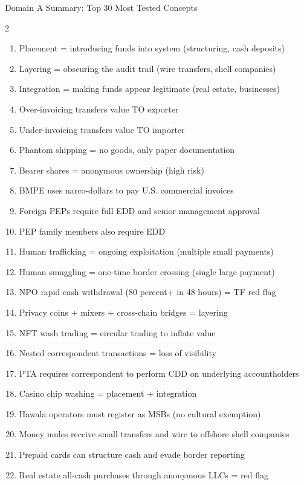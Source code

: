 \documentclass[11pt,a4paper]{beamer}
\begin{document}
	\begin{frame}{Domain A Summary: Top 30 Most Tested Concepts}
		\begin{multicols}{2}
			\begin{enumerate}
				\item Placement = introducing funds into system (structuring, cash deposits)
				\item Layering = obscuring the audit trail (wire transfers, shell companies)
				\item Integration = making funds appear legitimate (real estate, businesses)
				\item Over-invoicing transfers value TO exporter
				\item Under-invoicing transfers value TO importer
				\item Phantom shipping = no goods, only paper documentation
				\item Bearer shares = anonymous ownership (high risk)
				\item BMPE uses narco-dollars to pay U.S. commercial invoices
				\item Foreign PEPs require full EDD and senior management approval
				\item PEP family members also require EDD
				\item Human trafficking = ongoing exploitation (multiple small payments)
				\item Human smuggling = one-time border crossing (single large payment)
				\item NPO rapid cash withdrawal (80 percent+ in 48 hours) = TF red flag
				\item Privacy coins + mixers + cross-chain bridges = layering
				\item NFT wash trading = circular trading to inflate value
				\item Nested correspondent transactions = loss of visibility
				\item PTA requires correspondent to perform CDD on underlying accountholders
				\item Casino chip washing = placement + integration
				\item Hawala operators must register as MSBs (no cultural exemption)
				\item Money mules receive small transfers and wire to offshore shell companies
				\item Prepaid cards can structure cash and evade border reporting
				\item Real estate all-cash purchases through anonymous LLCs = red flag

\end{enumerate}
\end{multicols}
\end{frame}
\end{document}
